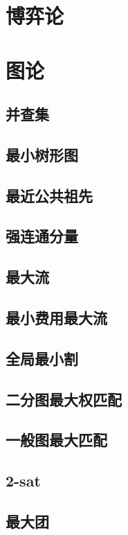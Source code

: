 \documentclass{article}
\begin{document}
\section{博弈论}


\section{图论}
\subsection{并查集}

\subsection{最小树形图}

\subsection{最近公共祖先}

\subsection{强连通分量}

\subsection{最大流}

\subsection{最小费用最大流}

\subsection{全局最小割}

\subsection{二分图最大权匹配}

\subsection{一般图最大匹配}
\subsection{2-sat}
\subsection{最大团}

\end{document}
